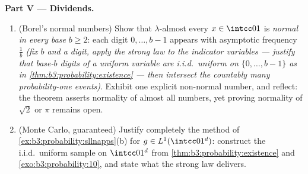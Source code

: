 \begin{problem}
\medskip
\noindent\textbf{Part V --- Dividends.}
\begin{enumerate}[resume]
  \item (Borel's normal numbers) Show that
        $\lambda$-almost every $x \in \intcc01$ is
        \emph{normal in every base} $b \geq 2$: each digit
        $0, \dots, b-1$ appears with asymptotic frequency
        $\frac1b$ \emph{(fix $b$ and a digit, apply the
        strong law to the indicator variables --- justify
        that base-$b$ digits of a uniform variable are
        i.i.d.\ uniform on $\{0,\dots,b-1\}$ as in
        \cref{thm:b3:probability:existence} --- then
        intersect the countably many probability-one
        events)}. Exhibit one explicit non-normal number,
        and reflect: the theorem asserts normality of almost
        all numbers, yet proving normality of $\sqrt2$ or
        $\pi$ remains open.
  \item (Monte Carlo, guaranteed) Justify completely the
        method of \cref{ex:b3:probability:sllnapps}(b) for
        $g \in L^1(\intcc01^d)$: construct the i.i.d.\
        uniform sample on $\intcc01^d$ from
        \cref{thm:b3:probability:existence} and
        \cref{exo:b3:probability:10}, and state what the
        strong law delivers.
\end{enumerate}


\end{problem}
